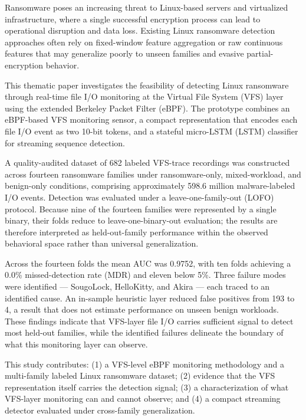 Ransomware poses an increasing threat to Linux-based servers and virtualized infrastructure, where a single successful encryption process can lead to operational disruption and data loss. Existing Linux ransomware detection approaches often rely on fixed-window feature aggregation or raw continuous features that may generalize poorly to unseen families and evasive partial-encryption behavior.

This thematic paper investigates the feasibility of detecting Linux ransomware through real-time file I/\allowbreak{}O monitoring at the Virtual File System (VFS) layer using the extended Berkeley Packet Filter (eBPF). The prototype combines an eBPF-based VFS monitoring sensor, a compact representation that encodes each file I/\allowbreak{}O event as two 10-bit tokens, and a stateful micro-LSTM (\textmu{}LSTM) classifier for streaming sequence detection.

A quality-audited dataset of 682 labeled VFS-trace recordings was constructed across fourteen ransomware families under ransomware-only, mixed-workload, and benign-only conditions, comprising approximately 598.6 million malware-labeled I/\allowbreak{}O events. Detection was evaluated under a leave-one-family-out (LOFO) protocol. Because nine of the fourteen families were represented by a single binary, their folds reduce to leave-one-binary-out evaluation; the results are therefore interpreted as held-out-family performance within the observed behavioral space rather than universal generalization.

Across the fourteen folds the mean AUC was 0.9752, with ten folds achieving a 0.0\% missed-detection rate (MDR) and eleven below 5\%. Three failure modes were identified --- SougoLock, HelloKitty, and Akira --- each traced to an identified cause. An in-sample heuristic layer reduced false positives from 193 to 4, a result that does not estimate performance on unseen benign workloads. These findings indicate that VFS-layer file I/\allowbreak{}O carries sufficient signal to detect most held-out families, while the identified failures delineate the boundary of what this monitoring layer can observe.

This study contributes: (1) a VFS-level eBPF monitoring methodology and a multi-family labeled Linux ransomware dataset; (2) evidence that the VFS representation itself carries the detection signal; (3) a characterization of what VFS-layer monitoring can and cannot observe; and (4) a compact streaming detector evaluated under cross-family generalization.


